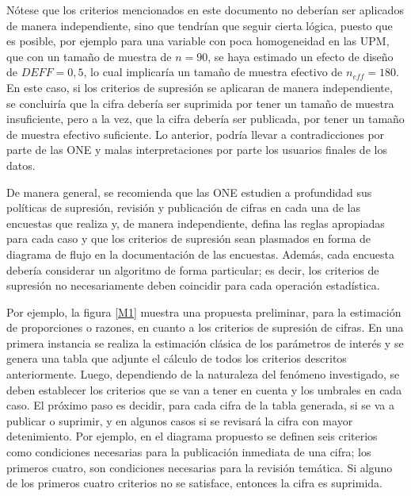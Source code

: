 \documentclass[
  10pt,
  spanish,
]{book}
\begin{document}
Nótese que los criterios mencionados en este documento no deberían ser aplicados de manera independiente, sino que tendrían que seguir cierta lógica, puesto que es posible, por ejemplo para una variable con poca homogeneidad en las UPM, que con un tamaño de muestra de \(n=90\), se haya estimado un efecto de diseño de \(DEFF=0,5\), lo cual implicaría un tamaño de muestra efectivo de \(n_{eff}=180\). En este caso, si los criterios de supresión se aplicaran de manera independiente, se concluiría que la cifra debería ser suprimida por tener un tamaño de muestra insuficiente, pero a la vez, que la cifra debería ser publicada, por tener un tamaño de muestra efectivo suficiente. Lo anterior, podría llevar a contradicciones por parte de las ONE y malas interpretaciones por parte los usuarios finales de los datos.

De manera general, se recomienda que las ONE estudien a profundidad sus políticas de supresión, revisión y publicación de cifras en cada una de las encuestas que realiza y, de manera independiente, defina las reglas apropiadas para cada caso y que los criterios de supresión sean plasmados en forma de diagrama de flujo en la documentación de las encuestas. Además, cada encuesta debería considerar un algoritmo de forma particular; es decir, los criterios de supresión no necesariamente deben coincidir para cada operación estadística.

Por ejemplo, la figura \ref{M1} muestra una propuesta preliminar, para la estimación de proporciones o razones, en cuanto a los criterios de supresión de cifras. En una primera instancia se realiza la estimación clásica de los parámetros de interés y se genera una tabla que adjunte el cálculo de todos los criterios descritos anteriormente. Luego, dependiendo de la naturaleza del fenómeno investigado, se deben establecer los criterios que se van a tener en cuenta y los umbrales en cada caso. El próximo paso es decidir, para cada cifra de la tabla generada, si se va a publicar o suprimir, y en algunos casos si se revisará la cifra con mayor detenimiento. Por ejemplo, en el diagrama propuesto se definen seis criterios como condiciones necesarias para la publicación inmediata de una cifra; los primeros cuatro, son condiciones necesarias para la revisión temática. Si alguno de los primeros cuatro criterios no se satisface, entonces la cifra es suprimida.
\end{document}
